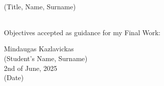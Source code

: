 %
\hspace{\fill}
%
\begin{minipage}[t]{0.7\textwidth}
\\\medskip\scriptsize (Title, Name, Surname)
\end{minipage}
%
\\[1.0\baselineskip]
\noindent
Objectives accepted as guidance for my Final Work:\\[0.5\baselineskip]
\begin{minipage}[t]{0.3\textwidth}
    \begin{center}
    {Mindaugas Kazlavickas}\\\medskip
    {\footnotesize (Student's Name, Surname)}\\[1.0\baselineskip]
    {2nd of June, 2025}\\\medskip
    {\footnotesize (Date)}\\
    \end{center}
\end{minipage}